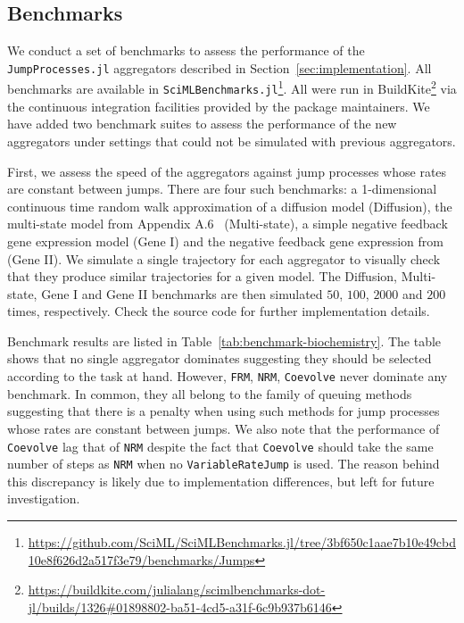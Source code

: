 \documentclass{juliacon}
\numberwithin{equation}{section}
\begin{document}
\subsection{Benchmarks} \label{subsec:benchmark}

We conduct a set of benchmarks to assess the performance of the \texttt{JumpProcesses.jl} aggregators described in Section~\ref{sec:implementation}. All benchmarks are available in \texttt{SciMLBenchmarks.jl}\footnote{\url{https://github.com/SciML/SciMLBenchmarks.jl/tree/3bf650c1aae7b10e49cbd10e8f626d2a517f3e79/benchmarks/Jumps}}. All were run in BuildKite\footnote{\url{https://buildkite.com/julialang/scimlbenchmarks-dot-jl/builds/1326\#01898802-ba51-4cd5-a31f-6c9b937b6146}} via the continuous integration facilities provided by the package maintainers. We have added two benchmark suites to assess the performance of the new aggregators under settings that could not be simulated with previous aggregators.

First, we assess the speed of the aggregators against jump processes whose rates are constant between jumps. There are four such benchmarks: a 1-dimensional continuous time random walk approximation of a diffusion model (Diffusion), the multi-state model from Appendix A.6~\cite{marchetti2017} (Multi-state), a simple negative feedback gene expression model (Gene I) and the negative feedback gene expression from~\cite{gupta2018} (Gene II). We simulate a single trajectory for each aggregator to visually check that they produce similar trajectories for a given model. The Diffusion, Multi-state, Gene I and Gene II benchmarks are then simulated \( 50 \), \( 100 \), \( 2000 \) and \( 200 \) times, respectively. Check the source code for further implementation details.

Benchmark results are listed in Table~\ref{tab:benchmark-biochemistry}. The table shows that no single aggregator dominates suggesting they should be selected according to the task at hand. However, \texttt{FRM}, \texttt{NRM}, \texttt{Coevolve} never dominate any benchmark. In common, they all belong to the family of queuing methods suggesting that there is a penalty when using such methods for jump processes whose rates are constant between jumps. We also note that the performance of \texttt{Coevolve} lag that of \texttt{NRM} despite the fact that \texttt{Coevolve} should take the same number of steps as \texttt{NRM} when no \texttt{VariableRateJump} is used. The reason behind this discrepancy is likely due to implementation differences, but left for future investigation.
\end{document}
